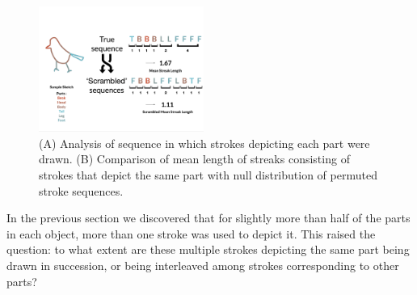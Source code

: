 \documentclass[10pt,letterpaper]{article}
\begin{document}
\begin{figure}[htbp]
\centering
\includegraphics[width=0.48\textwidth]{figures/part_sequence.pdf}
\caption{(A) Analysis of sequence in which strokes depicting each part were drawn. (B) Comparison of mean length of streaks consisting of strokes that depict the same part with null distribution of permuted stroke sequences.}
\label{stroke_sequence_fig}
\end{figure}


In the previous section we discovered that for slightly more than half of the parts in each object, more than one stroke was used to depict it. 
This raised the question: to what extent are these multiple strokes depicting the same part being drawn in succession, or being interleaved among strokes corresponding to other parts?
\end{document}
